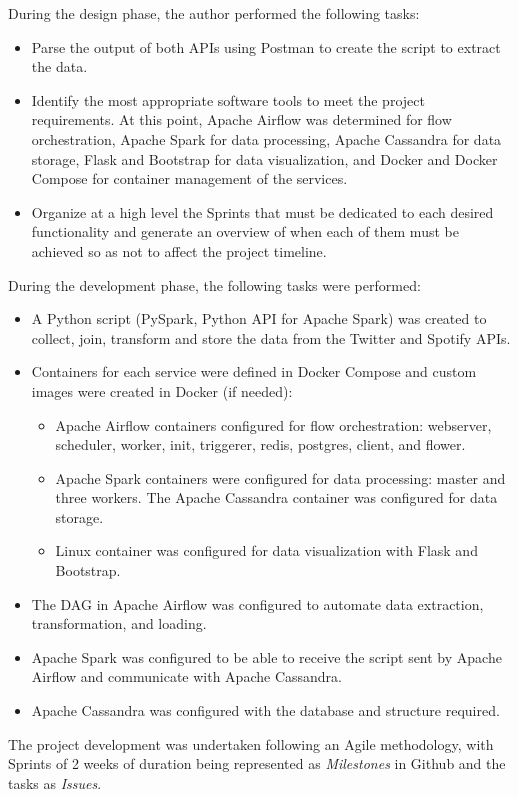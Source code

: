 \nonzeroparskip During the design phase, the author performed the following tasks:
\begin{itemize}
	\item Parse the output of both APIs using Postman to create the script to extract the data.
	\item Identify the most appropriate software tools to meet the project requirements. At this point, Apache Airflow was determined for flow orchestration, Apache Spark for data processing, Apache Cassandra for data storage, Flask and Bootstrap for data visualization, and Docker and Docker Compose for container management of the services.
	\item Organize at a high level the Sprints that must be dedicated to each desired functionality and generate an overview of when each of them must be achieved so as not to affect the project timeline.
\end{itemize}

\nonzeroparskip During the development phase, the following tasks were performed:
\begin{itemize}
	\item A Python script (PySpark, Python API for Apache Spark) was created to collect, join, transform and store the data from the Twitter and Spotify APIs.
	\item Containers for each service were defined in Docker Compose and custom images were created in Docker (if needed):
	\begin{itemize}
		\item Apache Airflow containers configured for flow orchestration: webserver, scheduler, worker, init, triggerer, redis, postgres, client, and flower.
		\item Apache Spark containers were configured for data processing: master and three workers.
The Apache Cassandra container was configured for data storage.
		\item Linux container was configured for data visualization with Flask and Bootstrap.
	\end{itemize}
	\item The DAG in Apache Airflow was configured to automate data extraction, transformation, and loading.
	\item Apache Spark was configured to be able to receive the script sent by Apache Airflow and communicate with Apache Cassandra.
	\item Apache Cassandra was configured with the database and structure required.
\end{itemize}

\nonzeroparskip The project development was undertaken following an Agile methodology, with Sprints of 2 weeks of duration being represented as \textit{Milestones} in Github and the tasks as \textit{Issues}.